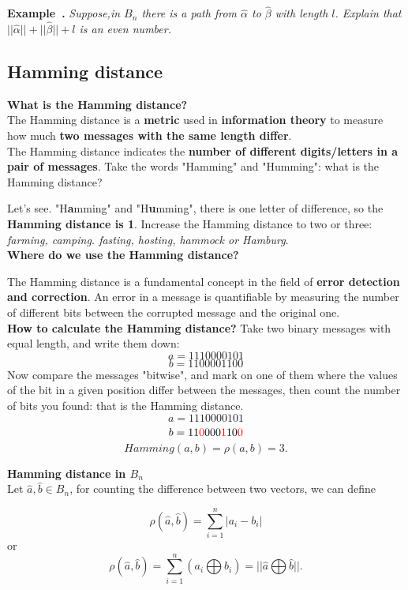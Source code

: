 \documentclass{article}
\newcounter{example}
\newenvironment{example}[1][]{\refstepcounter{example}\par\medskip
\noindent\textbf{Example~\theexample. #1} \rmfamily}{\medskip}
\begin{document}
\begin{example}
    \textit{Suppose,in $B_n$ there is a path from $\hat{\alpha}$ to $\hat{\beta}$ with length $l$. Explain that $|| \hat{\alpha} ||+ || \hat{\beta}||+l $ is an even number.}
\end{example}

\subsection{Hamming distance}
\textbf{What is the Hamming distance?}
\\The Hamming distance is a \textbf{metric} used in \textbf{information theory} to measure how much \textbf{two messages with the same length differ}.
\\The Hamming distance indicates the \textbf{number of different digits/letters in a pair of messages}. Take the words "Hamming" and "Humming": what is the Hamming distance?

Let's see. "H\textbf{a}mming" and "H\textbf{u}mming", there is one letter of difference, so the\textbf{ Hamming distance is 1}.
Increase the Hamming distance to two or three: 
\textit{farming, camping.  fasting, hosting, hammock or Hamburg}.
\\\textbf{Where do we use the Hamming distance?}

The Hamming distance is a fundamental concept in the field of \textbf{error detection and correction}. An error in a message is quantifiable by measuring the number of different bits between the corrupted message and the original one.
\\\textbf{How to calculate the Hamming distance?}
Take two binary messages with equal length, and write them down:
$$a=1110000101$$
$$b=1100001100$$
   Now compare the messages "bitwise", and mark on one of them where the values of the bit in a given position differ between the messages, then count the number of bits you found: that is the Hamming distance.
$$a=1 1 1 0 0 0 0 1 0 1 $$
$$b=11\color{red}0\color{black}000\color{red}1\color{black}10\color{red}0$$
$$Hamming(a,b) = \rho(a,b)=3.$$

\newpage
\textbf{Hamming distance in $B_n$} 
\\Let $\hat{a},\hat{b} \in B_n$, for counting the difference between two vectors, we can define

$$\rho(\hat{a},\hat{b}) = \sum_{i=1}^{n} |a_i - b_i|$$ or 
$$\rho(\hat{a},\hat{b}) = \sum_{i=1}^{n} (a_i \bigoplus b_i)= ||\hat{a} \bigoplus \hat{b}||.$$
\end{document}

